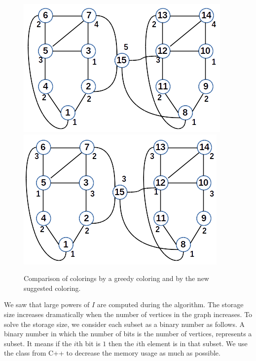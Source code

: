 \documentclass[12pt, twoside,a4paper,toc=bibliography]{scrbook}
\begin{document}
\begin{figure}
\centering
\includegraphics[width=0.48\linewidth]{coloring2}
\hfill
\includegraphics[width=0.48\linewidth]{coloring3}
\caption{Comparison of colorings by a greedy coloring and
by the new suggested coloring.}
\label{f.coloring.compared}
\end{figure}

We saw that large powers of $I$ are computed during the algorithm.
The storage size increases dramatically when the number of vertices
in the graph increases. To solve the storage size, we consider each 
subset as a binary number as follows. A binary number in which
the number of bits is the number of vertices, represents a subset.
It means if the $i$th bit is $1$ then the $i$th element is in that subset.
We use the class  from C++ to decrease the memory usage as much
as possible.
\end{document}
